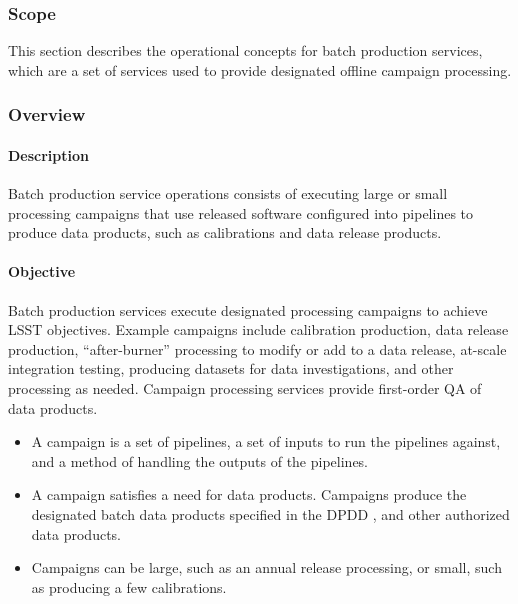 \subsubsection{Scope}

This section describes the operational concepts for batch production services,
which are a set of services used to provide designated offline campaign
processing.

\subsubsection{Overview}

\paragraph{Description}
Batch production service operations consists of executing large or small processing
campaigns that use released software configured into pipelines to produce data products,
such as calibrations and data release products.

\paragraph{Objective}
Batch production services execute designated processing campaigns to achieve
LSST objectives. Example campaigns include calibration production, data release
production, ``after-burner'' processing to modify or add to a data release,
at-scale integration testing, producing datasets for data investigations, and
other processing as needed. Campaign processing services provide first-order QA
of data products.

\begin{itemize}

\item A campaign is a set of pipelines, a set of inputs to run the pipelines
against, and a method of handling the outputs of the pipelines.

\item A campaign satisfies a need for data products. Campaigns produce the
designated batch data products specified in the DPDD , and
other authorized data products.

\item Campaigns can be large, such as an annual release processing, or small,
such as producing a few calibrations.

\end{itemize}

